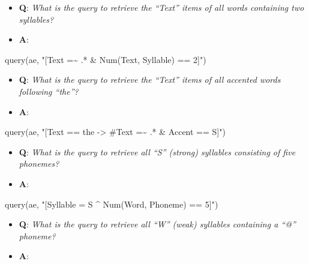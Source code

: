 \documentclass[
]{book}
\newenvironment{Shaded}{\begin{snugshade}}{\end{snugshade}}
\newcommand{\FunctionTok}[1]{\textcolor[rgb]{0.00,0.00,0.00}{#1}}
\newcommand{\NormalTok}[1]{#1}
\newcommand{\StringTok}[1]{\textcolor[rgb]{0.31,0.60,0.02}{#1}}
\providecommand{\tightlist}{%
  \setlength{\itemsep}{0pt}\setlength{\parskip}{0pt}}
\begin{document}
\begin{itemize}
\tightlist
\item
  \textbf{Q}: \emph{What is the query to retrieve the ``Text'' items of all words containing two syllables?}
\item
  \textbf{A}:
\end{itemize}

\begin{Shaded}
\begin{Highlighting}[]
\FunctionTok{query}\NormalTok{(ae, }\StringTok{"[Text =\textasciitilde{} .* \& Num(Text, Syllable) == 2]"}\NormalTok{)}
\end{Highlighting}
\end{Shaded}

\begin{itemize}
\tightlist
\item
  \textbf{Q}: \emph{What is the query to retrieve the ``Text'' items of all accented words following ``the''?}
\item
  \textbf{A}:
\end{itemize}

\begin{Shaded}
\begin{Highlighting}[]
\FunctionTok{query}\NormalTok{(ae, }\StringTok{"[Text == the {-}\textgreater{} \#Text =\textasciitilde{} .* \& Accent == S]"}\NormalTok{)}
\end{Highlighting}
\end{Shaded}

\begin{itemize}
\tightlist
\item
  \textbf{Q}: \emph{What is the query to retrieve all ``S'' (strong) syllables consisting of five phonemes?}
\item
  \textbf{A}:
\end{itemize}

\begin{Shaded}
\begin{Highlighting}[]
\FunctionTok{query}\NormalTok{(ae, }\StringTok{"[Syllable = S \^{} Num(Word, Phoneme) == 5]"}\NormalTok{)}
\end{Highlighting}
\end{Shaded}

\begin{itemize}
\tightlist
\item
  \textbf{Q}: \emph{What is the query to retrieve all ``W'' (weak) syllables containing a ``@'' phoneme?}
\item
  \textbf{A}:
\end{itemize}
\end{document}
